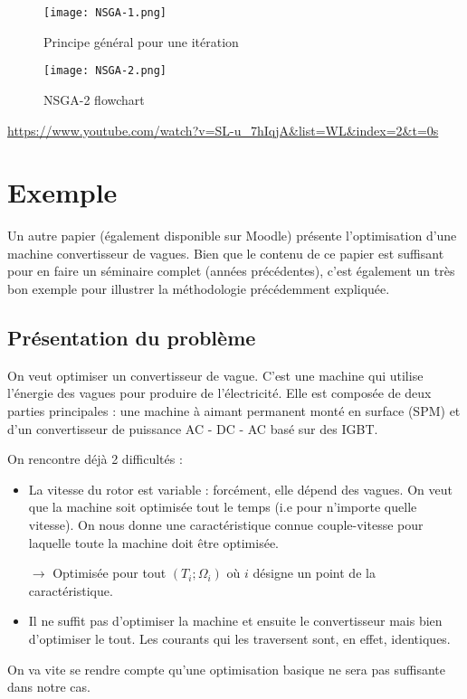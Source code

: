 \begin{figure}[H]
    \centering
    \texttt{[image: NSGA-1.png]}
    \caption{Principe général pour une itération}
\end{figure}

\begin{figure}[H]
    \centering
    \texttt{[image: NSGA-2.png]}
    \caption{NSGA-2 flowchart}
\end{figure}


\url{ https://www.youtube.com/watch?v=SL-u_7hIqjA&list=WL&index=2&t=0s}


\section{Exemple}
Un autre papier (également disponible sur Moodle) présente l'optimisation d'une machine convertisseur de vagues. Bien que le contenu de ce papier est suffisant pour en faire un séminaire complet (années précédentes), c'est également un très bon exemple pour illustrer la méthodologie précédemment expliquée.

\subsection{Présentation du problème}
On veut optimiser un convertisseur de vague. C'est une machine qui utilise l'énergie des vagues pour produire de l'électricité. Elle est composée de deux parties principales : une machine à aimant permanent monté en surface (SPM) et d'un convertisseur de puissance AC - DC - AC basé sur des IGBT.

On rencontre déjà 2 difficultés :
\begin{itemize}
    \item La vitesse du rotor est variable : forcément, elle dépend des vagues. On veut que la machine soit optimisée tout le temps (i.e pour n'importe quelle vitesse). On nous donne une caractéristique connue couple-vitesse pour laquelle toute la machine doit être optimisée.
    
    $\rightarrow$ Optimisée pour tout $(T_i;\Omega_i)$ où $i$ désigne un point de la caractéristique.
    
    \item Il ne suffit pas d'optimiser la machine et ensuite le convertisseur mais bien d'optimiser le tout. Les courants qui les traversent sont, en effet, identiques. 
\end{itemize}
On va vite se rendre compte qu'une optimisation basique ne sera pas suffisante dans notre cas.


